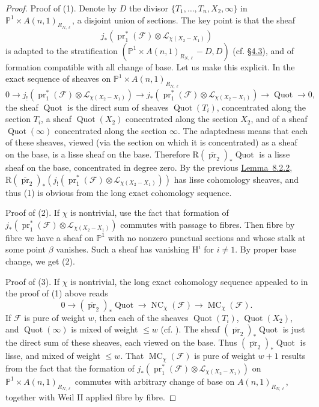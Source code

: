 \begin{proof}
Proof of (1). Denote by \(D\) the divisor \(\{T_1,\ldots,T_n,X_2,\infty\}\) in \(\mathbb{P}^1\times A(n,1)_{R_{N,\ell}}\), a disjoint union of sections. The key point is that the sheaf
\[
j_*(\operatorname{pr}_1^*(\mathcal{F})\otimes\mathcal{L}_{\chi(X_2-X_1)})
\]
is adapted to the stratification \((\mathbb{P}^1\times A(n,1)_{R_{N,\ell}}-D,D)\) (cf. \hyperref[sec:4.3]{\S4.3}), and of formation compatible with all change of base. Let us make this explicit. In the exact sequence of sheaves on \(\mathbb{P}^1\times A(n,1)_{R_{N,\ell}}\)
\[
0\to j_!(\operatorname{pr}_1^*(\mathcal{F})\otimes\mathcal{L}_{\chi(X_2-X_1)})\to j_*(\operatorname{pr}_1^*(\mathcal{F})\otimes\mathcal{L}_{\chi(X_2-X_1)})\to\operatorname{Quot}\to0,
\]
the sheaf \(\operatorname{Quot}\) is the direct sum of sheaves \(\operatorname{Quot}(T_i)\), concentrated along the section \(T_i\), a sheaf \(\operatorname{Quot}(X_2)\) concentrated along the section \(X_2\), and of a sheaf \(\operatorname{Quot}(\infty)\) concentrated along the section \(\infty\). The adaptedness means that each of these sheaves, viewed (via the section on which it is concentrated) as a sheaf on the base, is a lisse sheaf on the base. Therefore \(\mathrm{R}(\overline{\operatorname{pr}}_2)_*\operatorname{Quot}\) is a lisse sheaf on the base, concentrated in degree zero. By the previous \hyperref[lem:8.2.2]{Lemma~8.2.2}, \(\mathrm{R}(\overline{\operatorname{pr}}_2)_*(j_!(\operatorname{pr}_1^*(\mathcal{F})\otimes\mathcal{L}_{\chi(X_2-X_1)}))\) has lisse cohomology sheaves, and thus (1) is obvious from the long exact cohomology sequence.

Proof of (2). If \(\chi\) is nontrivial, use the fact that formation of \(j_*(\operatorname{pr}_1^*(\mathcal{F})\otimes\mathcal{L}_{\chi(X_2-X_1)})\) commutes with passage to fibres. Then fibre by fibre we have a sheaf on \(\mathbb{P}^1\) with no nonzero punctual sections and whose stalk at some point \(\beta\) vanishes. Such a sheaf has vanishing \(\mathrm{H}^i\) for \(i\ne1\). By proper base change, we get (2).

Proof of (3). If \(\chi\) is nontrivial, the long exact cohomology sequence appealed to in the proof of (1) above reads
\[
0\to(\overline{\operatorname{pr}}_2)_*\operatorname{Quot}\to\operatorname{NC}_\chi(\mathcal{F})\to\operatorname{MC}_\chi(\mathcal{F}).
\]
If \(\mathcal{F}\) is pure of weight \(w\), then each of the sheaves \(\operatorname{Quot}(T_i)\), \(\operatorname{Quot}(X_2)\), and \(\operatorname{Quot}(\infty)\) is mixed of weight \(\leq w\) (cf. \cite[4.7.4]{Ka-SE}). The sheaf \((\overline{\operatorname{pr}}_2)_*\operatorname{Quot}\) is just the direct sum of these sheaves, each viewed on the base. Thus \((\overline{\operatorname{pr}}_2)_*\operatorname{Quot}\) is lisse, and mixed of weight \(\leq w\). That \(\operatorname{MC}_\chi(\mathcal{F})\) is pure of weight \(w+1\) results from the fact that the formation of \(j_*(\operatorname{pr}_1^*(\mathcal{F})\otimes\mathcal{L}_{\chi(X_2-X_1)})\) on \(\mathbb{P}^1\times A(n,1)_{R_{N,\ell}}\) commutes with arbitrary change of base on \(A(n,1)_{R_{N,\ell}}\), together with Weil II \cite[3.2.3]{De-WeilII} applied fibre by fibre.


\end{proof}
